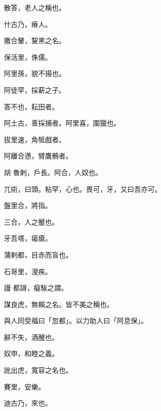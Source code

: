 \begin{pinyinscope}
 散答，老人之稱也。



 什古乃，瘠人。



 撒合輦，黧黑之名。



 保活里，侏儒。



 阿里孫，貌不揚也。



 阿徒罕，採薪之子。



 答不也，耘田者。



 阿土古，善採捕者。阿里喜，圍獵也。



 拔里速，角牴戲者。



 阿離合懣，臂鷹鶻者。



 胡
 魯剌，戶長。阿合，人奴也。



 兀術，曰頭。粘罕，心也。畏可，牙，又曰吾亦可。



 盤里合，將指。



 三合，人之靨也。



 牙吾塔，瘍瘡。



 蒲剌都，目赤而盲也。



 石哥里，溲疾。



 謾
 都謌，癡騃之謂。



 謀良虎，無賴之名。皆不美之稱也。



 與人同受福曰「忽都」。以力助人曰「阿息保」。



 辭不失，酒醒也。



 奴申，和睦之義。



 訛出虎，寬容之名也。



 賽里，安樂。



 迪古乃，來也。




\end{pinyinscope}
